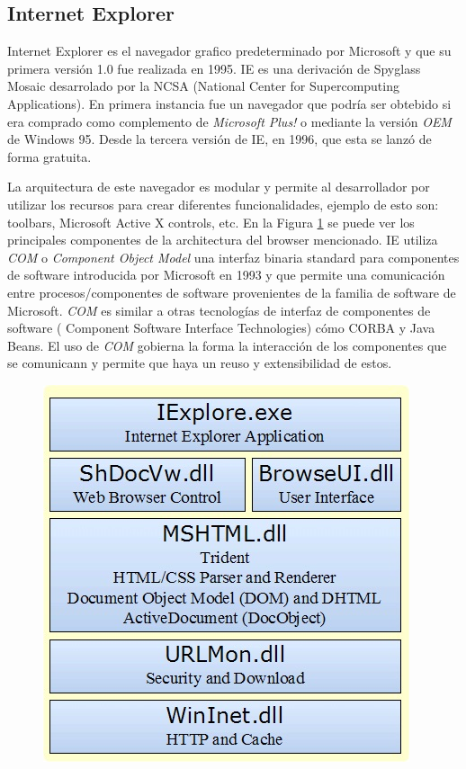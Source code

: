     \subsection{Internet Explorer}
    \label{chap3:IE}
    Internet Explorer es el navegador grafico predeterminado por Microsoft y que su primera versión 1.0 fue realizada en 1995. IE es una derivación de Spyglass Mosaic desarrolado por la NCSA (National Center for Supercomputing Applications). En primera instancia fue un navegador que podría ser obtebido si era comprado como complemento de \textit{Microsoft Plus!} o mediante la versión \textit{OEM} de Windows 95. Desde la tercera versión de IE, en 1996, que esta se lanzó de forma gratuita.
            
    La arquitectura de este navegador es modular y permite al desarrollador por utilizar los recursos para crear diferentes funcionalidades, ejemplo de esto son: toolbars, Microsoft Active X controls, etc. En la Figura \ref{fig:archIE} \cite{IEArch} se puede ver los principales componentes de la architectura del browser mencionado. IE utiliza \textit{COM} o \textit{Component Object Model} una interfaz binaria standard para componentes de software introducida por Microsoft en 1993 y que permite una comunicación entre procesos/componentes de software provenientes de la familia de software de Microsoft. \textit{COM} es similar a otras tecnologías de interfaz de componentes de software ( Component Software Interface Technologies) cómo CORBA y Java Beans. El uso de \textit{COM} gobierna la forma la interacción de los componentes que se comunicann y permite que haya un reuso y extensibilidad de estos.
            
    \begin{figure}[h!t]
        \begin{center}
    		\includegraphics[scale=0.65]{figures/IEArch.jpg}
          \label{fig:archIE}
        \end{center}
    \end{figure}
   
